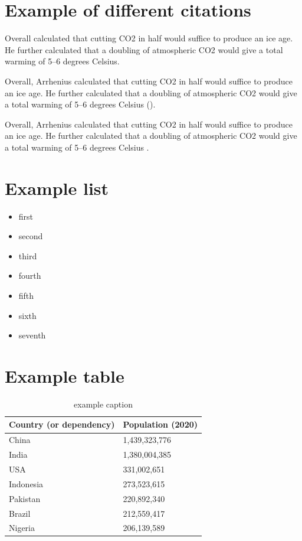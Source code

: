\section{Example of different citations}
Overall \textcite{arrhenius1896xxxi} calculated that cutting CO2 in half would suffice to produce an ice age. He further calculated that a doubling of atmospheric CO2 would give a total warming of 5–6 degrees Celsius.

\noindent
Overall, Arrhenius calculated that cutting CO2 in half would suffice to produce an ice age. He further calculated that a doubling of atmospheric CO2 would give a total warming of 5–6 degrees Celsius (\cite{arrhenius1896xxxi}).

\noindent
Overall, Arrhenius calculated that cutting CO2 in half would suffice to produce an ice age. He further calculated that a doubling of atmospheric CO2 would give a total warming of 5–6 degrees Celsius \parencite{arrhenius1896xxxi}.

\section{Example list}
\begin{itemize}
    \item first
    \item second
    \item third
    \item fourth
    \item fifth
    \item sixth
    \item seventh
\end{itemize}

\section{Example table}

\begin{table}[H]
\centering
\begin{tabular}{|l|l|}
\hline
\rowcolor{gray!50}
Country (or dependency) & Population (2020) \\ \hline
China                  & 1,439,323,776       \\ \hline
India                  & 1,380,004,385        \\ \hline
USA                    & 331,002,651           \\ \hline
Indonesia              & 273,523,615            \\ \hline
Pakistan               & 220,892,340             \\ \hline
Brazil                 & 212,559,417              \\ \hline
Nigeria                & 206,139,589               \\ \hline
\end{tabular}
\caption{example caption }
\label{tbl:example_table}
\end{table}

